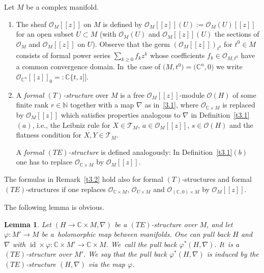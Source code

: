 \documentclass[pdftex]{sigma}%
\numberwithin{equation}{section}
\numberwithin{figure}{section}
\newcommand{\N}{{\mathbb N}}
\newcommand{\C}{{\mathbb C}}
\newcommand{\OO}{{\mathcal O}}
\newcommand{\TT}{{\mathcal T}}
\newcommand{\nnn}{\nabla}
\DeclareMathOperator{\id}{id}
\newtheorem{Lemma}[Theorem]{Lemma}
\begin{document}
\begin{Definition}%
Let $M$ be a complex manifold.
\begin{enumerate}\itemsep=0pt
\item[$(a)$] The sheaf $\OO_M[[z]]$ on $M$ is defined by
$\OO_M[[z]](U):=\OO_M(U)[[z]]$
for an open subset $U\subset M$
(with $\OO_M(U)$ and $\OO_M[[z]](U)$ the sections of
$\OO_M$ and $\OO_M[[z]]$ on $U$).
Observe that the germ $(\OO_M[[z]])_{t^0}$ for $t^0\in M$
consists of formal power series $\sum_{k\geq 0}f_kz^k$ whose
coefficients $f_k\in\OO_{M,t^0}$ have a common
convergence domain. In~the case of $\big(M,t^0\big)=\big(\C^n,0\big)$ we write
$\OO_{\C^n}[[z]]_0=:\C\{t,z]]$.

\item[$(b)$] A {\it formal $(T)$-structure} over $M$ is a free
$\OO_M[[z]]$-module $\OO(H)$ of some finite rank $r\in\N$
together with a map
$\nnn$ as in~\eqref{3.1}, where $\OO_{\C\times M}$ is replaced
by $\OO_M[[z]]$ which satisfies properties analogous to
$\nnn$ in Definition~\ref{t3.1}$(a)$, i.e., the
Leibniz rule for $X\in\TT_M$, \mbox{$a\in\OO_M[[z]]$}, $s\in\OO(H)$
and the flatness condition for $X,Y\in\TT_M$.

A {\it formal $(TE)$-structure} is defined analogously:
In Definition~\ref{t3.1}$(b)$ one has to replace
$\OO_{\C\times M}$ by $\OO_M[[z]]$.
\end{enumerate}
\end{Definition}

\begin{Remark}%
The formulas in Remark~\ref{t3.2} hold also
for formal $(T)$-structures and formal $(TE)$-structures
if one replaces $\OO_{\C\times M}$, $\OO_{U\times M}$
and $\OO_{(\C,0)\times M}$ by $\OO_M[[z]]$.
\end{Remark}

The following lemma is obvious.

\begin{Lemma}\label{t3.6}
Let $(H\to \C\times M,\nnn)$ be a $(TE)$-structure over $M$,
and let $\varphi\colon M'\to M$ be a~holo\-morphic map between
manifolds. One can pull back $H$ and $\nnn$ with
$\id\times\varphi\colon \C\times M'\to\C\times M$.
We~call the pull back $\varphi^*(H,\nnn)$. It~is a
$(TE)$-structure over $M'$. We say that the
pull back $\varphi^*(H,\nnn)$ is induced by the $(TE)$-structure
$(H,\nnn)$ via the map $\varphi$.
\end{Lemma}
\end{document}
